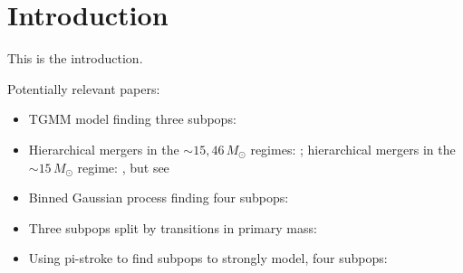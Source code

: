 \section{Introduction}
\label{sec:introduction}

This is the introduction.

Potentially relevant papers:
\begin{itemize}
    \item TGMM model finding three subpops: \cite{Hussain:2026pfm}
    \item Hierarchical mergers in the \(\sim15,46\,M_\odot\) regimes: \cite{Plunkett:2026pxt}; hierarchical mergers in the \(\sim15\,M_\odot\) regime: \cite{Tong:2025xir}, but see
    \item Binned Gaussian process finding four subpops: \cite{Ray:2026qer}
    \item Three subpops split by transitions in primary mass: \cite{Banagiri:2025dmy,Ray:2026uur}
    \item Using pi-stroke to find subpops to strongly model, four subpops: \cite{Guttman:2026cnv}
\end{itemize}

